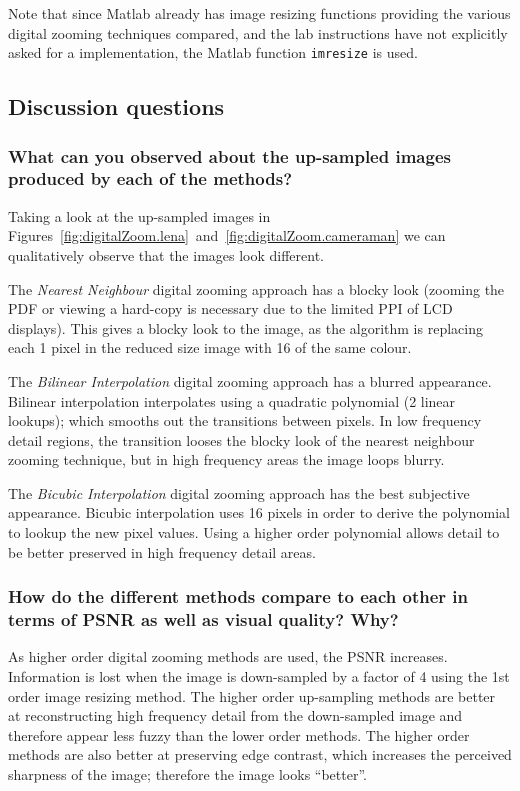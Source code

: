 \documentclass[article, 1.5space, letterpaper, 12pt, oneside, header, footer]{SydeClass}
\begin{document}
Note that since Matlab already has image resizing functions providing the various digital zooming techniques compared, and the lab instructions have not explicitly asked for a implementation, the Matlab function \texttt{imresize} is used.



\subsection{Discussion questions}

\subsubsection{What can you observed about the up-sampled images produced by each of the methods?}

Taking a look at the up-sampled images in Figures~\ref{fig:digitalZoom.lena}~and~\ref{fig:digitalZoom.cameraman} we can qualitatively observe that the images look different.

The \emph{Nearest Neighbour} digital zooming approach has a blocky look (zooming the PDF or viewing a hard-copy is necessary due to the limited PPI of LCD displays). This gives a blocky look to the image, as the algorithm is replacing each 1 pixel in the reduced size image with 16 of the same colour.

The \emph{Bilinear Interpolation} digital zooming approach has a blurred appearance. Bilinear interpolation interpolates using a quadratic polynomial (2 linear lookups); which smooths out the transitions between pixels. In low frequency detail regions, the transition looses the blocky look of the nearest neighbour zooming technique, but in high frequency areas the image loops blurry.

The \emph{Bicubic Interpolation} digital zooming approach has the best subjective appearance. Bicubic interpolation uses 16 pixels in order to derive the polynomial to lookup the new pixel values. Using a higher order polynomial allows detail to be better preserved in high frequency detail areas.

\subsubsection{How do the different methods compare to each other in terms of PSNR as well as visual quality? Why?}

As higher order digital zooming methods are used, the PSNR increases. Information is lost when the image is down-sampled by a factor of 4 using the 1st order image resizing method. The higher order up-sampling methods are better at reconstructing high frequency detail from the down-sampled image and therefore appear less fuzzy than the lower order methods. The higher order methods are also better at preserving edge contrast, which increases the perceived sharpness of the image; therefore the image looks ``better''.
\end{document}
